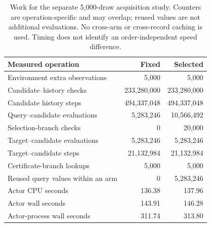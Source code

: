 \begin{table}[!ht]
\centering
\small
\begin{tabular}{lrr}
\toprule
Measured operation & Fixed & Selected\\
\midrule
Environment extra observations & 5,000 & 5,000\\
Candidate--history checks & 233,280,000 & 233,280,000\\
Candidate history steps & 494,337,048 & 494,337,048\\
Query--candidate evaluations & 5,283,246 & 10,566,492\\
Selection-branch checks & 0 & 20,000\\
Target--candidate evaluations & 5,283,246 & 5,283,246\\
Target--candidate steps & 21,132,984 & 21,132,984\\
Certificate-branch lookups & 5,000 & 5,000\\
Reused query values within an arm & 0 & 5,283,246\\
Actor CPU seconds & 136.38 & 137.96\\
Actor wall seconds & 143.91 & 146.28\\
Actor-process wall seconds & 311.74 & 313.80\\
\bottomrule
\end{tabular}
\caption{Work for the separate 5,000-draw acquisition study.
Counters are operation-specific and may overlap; reused values are
not additional evaluations. No cross-arm or cross-record caching is
used. Timing does not identify an order-independent speed difference.}
\label{tab:observation-work}
\end{table}
